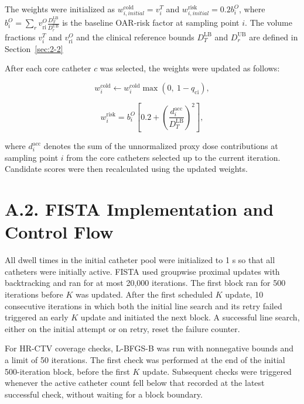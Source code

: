 \documentclass[12pt,twoside,letterpaper]{article}
\newcounter{algorithm}
\begin{document}
The weights were initialized as $w_{i,initial}^{\text{cold}} = v_{i}^{T}$ and $w_{i,initial}^{\text{risk}} = 0.2b_{i}^{O}$, where $b_{i}^{O} = \sum_{r}^{}v_{\text{ri}}^{O}\frac{D_{T}^{\text{LB}}}{D_{r}^{\text{UB}}}$ is the baseline OAR-risk factor at sampling point $i$. The volume fractions $v_{i}^{T}$ and $v_{\text{ri}}^{O}$ and the clinical reference bounds $D_{T}^{\text{LB}}$ and $D_{r}^{\text{UB}}$ are defined in Section~\ref{sec:2-2}

After each core catheter $c$ was selected, the weights were updated as follows:

\begin{equation}\tag{A1}w_{i}^{\text{cold}} \leftarrow w_{i}^{\text{cold}}\max\left( 0,\ 1 - q_{\text{ci}} \right),\end{equation}

\begin{equation}\tag{A2}w_{i}^{\text{risk}} = b_{i}^{O}\left\lbrack 0.2 + \left( \frac{d_{i}^{\text{acc}}}{D_{T}^{\text{LB}}} \right)^{2} \right\rbrack,\end{equation}

where $d_{i}^{\text{acc}}$ denotes the sum of the unnormalized proxy dose contributions at sampling point $i$ from the core catheters selected up to the current iteration. Candidate scores were then recalculated using the updated weights.

\clearpage




\section*{A.2. FISTA Implementation and Control Flow}

\renewcommand{\thealgorithm}{A\arabic{algorithm}}

All dwell times in the initial catheter pool were initialized to 1 s so that all catheters were initially active. FISTA used groupwise proximal updates with backtracking and ran for at most 20,000 iterations. The first block ran for 500 iterations before $K$ was updated. After the first scheduled $K$ update, 10 consecutive iterations in which both the initial line search and its retry failed triggered an early $K$ update and initiated the next block. A successful line search, either on the initial attempt or on retry, reset the failure counter.

For HR-CTV coverage checks, L-BFGS-B was run with nonnegative bounds and a limit of 50 iterations. The first check was performed at the end of the initial 500-iteration block, before the first $K$ update. Subsequent checks were triggered whenever the active catheter count fell below that recorded at the latest successful check, without waiting for a block boundary.
\end{document}
